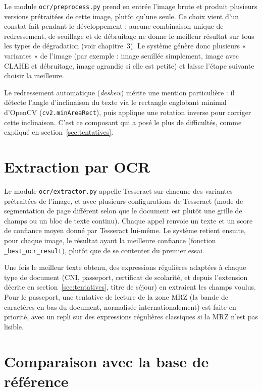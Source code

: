 Le module \texttt{ocr/preprocess.py} prend en entrée l'image brute et produit plusieurs versions prétraitées de cette image, plutôt qu'une seule. Ce choix vient d'un constat fait pendant le développement : aucune combinaison unique de redressement, de seuillage et de débruitage ne donne le meilleur résultat sur tous les types de dégradation (voir chapitre~3). Le système génère donc plusieurs « variantes » de l'image (par exemple : image seuillée simplement, image avec CLAHE et débruitage, image agrandie si elle est petite) et laisse l'étape suivante choisir la meilleure.

Le redressement automatique (\textit{deskew}) mérite une mention particulière : il détecte l'angle d'inclinaison du texte via le rectangle englobant minimal d'OpenCV (\texttt{cv2.minAreaRect}), puis applique une rotation inverse pour corriger cette inclinaison. C'est ce composant qui a posé le plus de difficultés, comme expliqué en section~\ref{sec:tentatives}.

\section{Extraction par OCR}

Le module \texttt{ocr/extractor.py} appelle Tesseract sur chacune des variantes prétraitées de l'image, et avec plusieurs configurations de Tesseract (mode de segmentation de page différent selon que le document est plutôt une grille de champs ou un bloc de texte continu). Chaque appel renvoie un texte et un score de confiance moyen donné par Tesseract lui-même. Le système retient ensuite, pour chaque image, le résultat ayant la meilleure confiance (fonction \texttt{\_best\_ocr\_result}), plutôt que de se contenter du premier essai.

Une fois le meilleur texte obtenu, des expressions régulières adaptées à chaque type de document (CNI, passeport, certificat de scolarité, et depuis l'extension décrite en section~\ref{sec:tentatives}, titre de séjour) en extraient les champs voulus. Pour le passeport, une tentative de lecture de la zone MRZ (la bande de caractères en bas du document, normalisée internationalement) est faite en priorité, avec un repli sur des expressions régulières classiques si la MRZ n'est pas lisible.

\section{Comparaison avec la base de référence}

